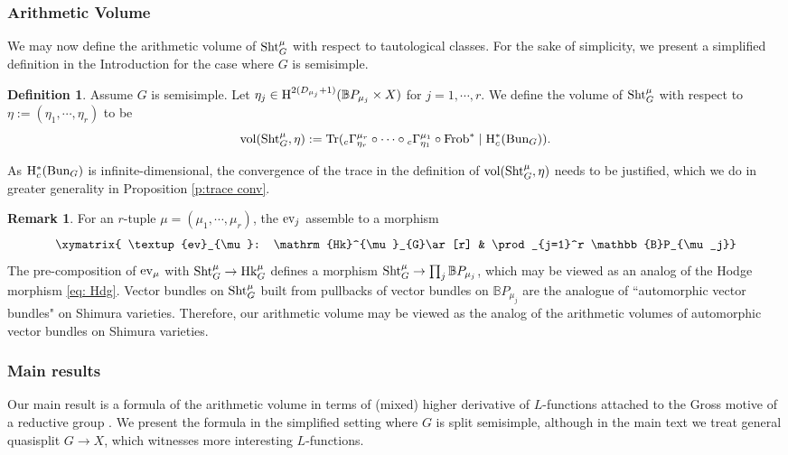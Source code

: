 \documentclass[reqno]{amsart}
\numberwithin{equation}{subsection}
\theoremstyle{definition}
\newtheorem{defn}[subsubsection]{Definition}
\newtheorem{remark}[subsubsection]{Remark}
\def\BB{\mathbb{B}}
\newcommand{\Bun}{\textup{Bun}}
\newcommand\ev{\textup{ev}}
\newcommand\Frob{\textup{Frob}}
\newcommand\Hk{\mathrm{Hk}}
\newcommand\Sht{\textup{Sht}}
\newcommand{\Tr}{\textup{Tr}}
\newcommand{\vol}{\textup{vol}}
\renewcommand\c\circ
\newcommand{\cohog}[2]{\textup{H}^{#1}({#2})}     %
\newcommand\G\Gamma
\newcommand{\y}{\eta}
\newcommand{\rH}{\ensuremath{\mathrm{H}}\xspace}
\begin{document}
\subsubsection{Arithmetic Volume} We may now define the arithmetic volume of $\Sht_G^\mu$ with respect to tautological classes. For the sake of simplicity, we present a simplified definition in the Introduction for the case where $G$ is semisimple.
 
\begin{defn} Assume $G$ is semisimple. Let $\y_j \in  \cohog{2(D_{\mu_j}+1)}{\BB P_{\mu_j}\times X}$ for $j=1,\cdots, r$. We define the volume of $\Sht^{\mu}_{G}$ with respect to  $\y :=(\y_1,\cdots,\y_r) $ to be
\begin{equation}\label{def vol Sht}
\vol(\Sht^{\mu}_{G}, \eta):= \Tr(
{}_{c}\G^{\mu_r}_{\y_r}\c\cdots\c  {}_{c}\G^{\mu_1}_{\y_1}\c\Frob^*   \mid \rH_c^*(\Bun_G)).
\end{equation}
\end{defn}

As $\rH_c^*(\Bun_G)$ is infinite-dimensional, the convergence of the trace in the definition of $\vol(\Sht^{\mu}_{G}, \eta)$ needs to be justified, which we do in greater generality in Proposition \ref{p:trace conv}.

\begin{remark}For an $r$-tuple $\mu=(\mu_{1},\cdots ,\mu_{r})$, the $\ev_{j}$ assemble to a morphism 
 $$ \xymatrix{ \ev_{\mu}: \Hk^{\mu}_{G}\ar[r] & \prod_{j=1}^r \BB P_{\mu_j}} 
 $$
  The pre-composition of $\ev_{\mu}$ with $\Sht^{\mu}_{G}\to \Hk^{\mu}_{G}$ defines a morphism  $\Sht^{\mu}_{G}\to \prod_{j} \BB P_{\mu_j}$, which may be viewed as an analog of the Hodge morphism \eqref{eq: Hdg}. Vector bundles on $\Sht^{\mu}_{G}$ built from pullbacks of vector bundles on $\BB P_{\mu_j}$ are the analogue of ``automorphic vector bundles" on Shimura varieties. Therefore, our arithmetic volume may be viewed as the analog of the arithmetic volumes of automorphic vector bundles on Shimura varieties.
\end{remark}

\subsubsection{Main results}
Our main result is a formula of the arithmetic volume in terms of (mixed) higher derivative of $L$-functions attached to the Gross motive of a reductive group \cite{Gro97}. We present the formula in the simplified setting where $G$ is split semisimple, although in the main text we treat general quasisplit $G\rightarrow X$, which witnesses more interesting $L$-functions. 
 
\end{document}
